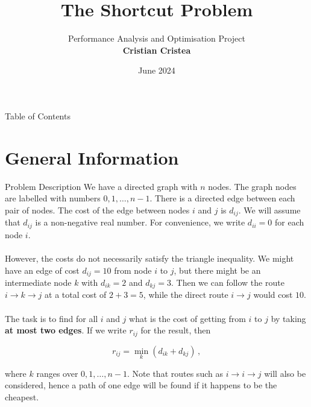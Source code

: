 \documentclass[british, svgnames, dvipsnames]{upb-beamer}
\title[The Shortcut Problem]{\textbf{\huge{The Shortcut Problem}}}
\author[Cristian Cristea]{\large{Performance Analysis and Optimisation Project\\[0.5cm]\textbf{Cristian Cristea}}}
\institute[UNSTPB -- ETTI]{\small{Faculty of Electronics, Telecommunications and Information Technology\\[0.5mm]National University of Science and Technology POLITEHNICA Bucharest}}
\date{June 2024}
\begin{document}
\begin{frame}
    \titlepage
\end{frame}

\begin{frame}{Table of Contents}
    \large{\tableofcontents}
\end{frame}


\section{General Information}

\begin{frame}{Problem Description}
    We have a directed graph with $n$ nodes. The graph nodes are labelled with numbers $0, 1, \dots, n - 1$. There is a directed edge between each pair of nodes. The cost of the edge between nodes $i$ and $j$ is $d_{ij}$. We will assume that $d_{ij}$ is a non-negative real number. For convenience, we write $d_{ii}=0$ for each node $i$.
    \\~\\
    However, the costs do not necessarily satisfy the triangle inequality. We might have an edge of cost $d_{ij}=10$ from node $i$ to $j$, but there might be an intermediate node $k$ with $d_{ik}=2$ and $d_{kj}=3$. Then we can follow the route $i \rightarrow k \rightarrow j$ at a total cost of $2 + 3 = 5$, while the direct route $i \rightarrow j$ would cost $10$.
    \\~\\
    The task is to find for all $i$ and $j$ what is the cost of getting from $i$ to $j$ by taking \textbf{at most two edges}. If we write $r_{ij}$ for the result, then
    
    $$r_{ij} = \min_k (d_{ik} + d_{kj})\,,$$
    
    where $k$ ranges over $0, 1, \dots, n - 1$. Note that routes such as $i \rightarrow i \rightarrow j$ will also be considered, hence a path of one edge will be found if it happens to be the cheapest.
\end{frame}
\end{document}
